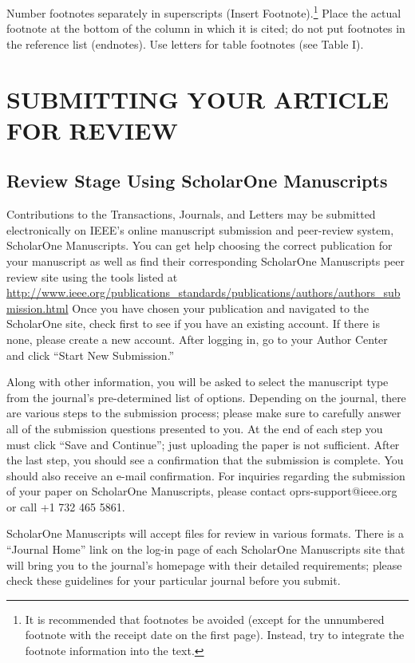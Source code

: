 \documentclass[letter]{IEEEtaes}
\begin{document}
Number footnotes separately in superscripts (Insert \textbar{}Footnote).\footnote{It is recommended that footnotes be avoided (except for the unnumbered footnote with the receipt date on the first page). Instead, try to integrate the footnote information into the text.} Place the actual footnote at the bottom of the column in which it is cited; do not put footnotes in the reference list (endnotes). Use letters for table footnotes (see Table I).

\section{SUBMITTING YOUR ARTICLE FOR REVIEW}

\subsection{Review Stage Using ScholarOne Manuscripts}

Contributions to the Transactions, Journals, and Letters may be submitted electronically on IEEE's online manuscript submission and peer-review system, ScholarOne Manuscripts. You can get help choosing the correct publication for your manuscript as well as find their corresponding ScholarOne Manuscripts peer review site using the tools listed at \href{http://www.ieee.org/publications\_standards/publications/authors/authors\_submission.html}{\url{http://www.ieee.org/publications\_standards/publications/authors/authors\_submission.html}} Once you have chosen your publication and navigated to the ScholarOne site, check first to see if you have an existing account. If there is none, please create a new account. After logging in, go to your Author Center and click ``Start New Submission.''

Along with other information, you will be asked to select the manuscript type from the journal's pre-determined list of options. Depending on the journal, there are various steps to the submission process; please make sure to carefully answer all of the submission questions presented to you. At the end of each step you must click ``Save and Continue''; just uploading the paper is not sufficient. After the last step, you should see a confirmation that the submission is complete. You should also receive an e-mail confirmation. For inquiries regarding the submission of your paper on ScholarOne Manuscripts, please contact oprs-support@ieee.org or call +1 732 465 5861.

ScholarOne Manuscripts will accept files for review in various formats. There is a ``Journal Home'' link on the log-in page of each ScholarOne Manuscripts site that will bring you to the journal's homepage with their detailed requirements; please check these guidelines for your particular journal before you submit.
\end{document}
